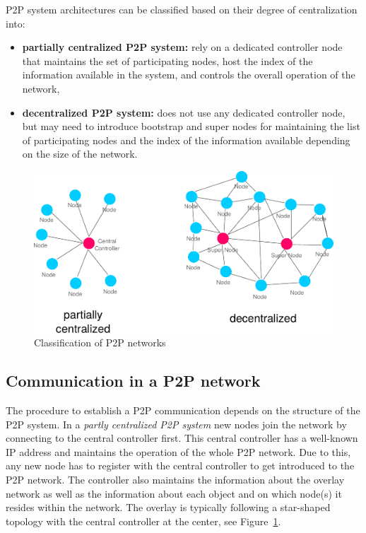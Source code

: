 \gls{P2P} system architectures can be classified based on their degree of centralization into: \@

\begin{itemize}
	\item \textbf{partially centralized \gls{P2P} system:} rely on a dedicated controller node that maintains the set of participating nodes, host the index of the information available in the system, and controls the overall operation of the network,
	\item \textbf{decentralized \gls{P2P} system:} does not use any dedicated controller node, but may need to introduce bootstrap and super nodes for maintaining the list of participating nodes and the index of the information available depending on the size of the network.
\end{itemize}

\begin{figure}[H]
	\centering
		\includegraphics[width=0.8\columnwidth]{images/p2p_network_structures.pdf}
	\caption{Classification of \gls{P2P} networks}
\label{fig:p2p_network_structures}
\end{figure}


\subsection{Communication in a \gls{P2P} network}
\label{sec:p2p_start_communication}

The procedure to establish a \gls{P2P} communication depends on the structure of the \gls{P2P} system. In a \emph{partly centralized \gls{P2P} system} new nodes join the network by connecting to the central controller first. This central controller has a well-known \gls{IP} address and maintains the operation of the whole \gls{P2P} network. Due to this, any new node has to register with the central controller to get introduced to the \gls{P2P} network. The controller also maintains the information about the overlay network as well as the information about each object and on which node(s) it resides within the network. The overlay is typically following a star-shaped topology with the central controller at the center, see Figure~\ref{fig:p2p_network_structures}. \\

